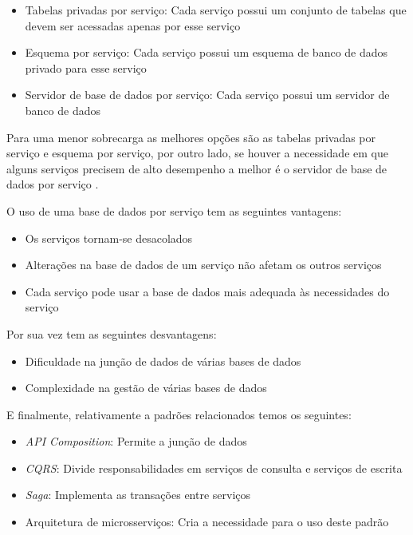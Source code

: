 \begin{itemize}
    \item Tabelas privadas por serviço: Cada serviço possui um conjunto de tabelas que devem ser acessadas apenas por esse serviço \cite{databasePerServicePattern}
    \item Esquema por serviço: Cada serviço possui um esquema de banco de dados privado para esse serviço \cite{databasePerServicePattern}
    \item Servidor de base de dados por serviço: Cada serviço possui um servidor de banco de dados \cite{databasePerServicePattern}
\end{itemize}

Para uma menor sobrecarga as melhores opções são as tabelas privadas por serviço e esquema por serviço, por outro lado, se houver a necessidade em que alguns serviços precisem de alto desempenho a melhor é o servidor de base de dados por serviço \cite{databasePerServicePattern}.

O uso de uma base de dados por serviço tem as seguintes vantagens:
\begin{itemize}
    \item Os serviços tornam-se desacolados \cite{databasePerServicePattern}
    \item Alterações na base de dados de um serviço não afetam os outros serviços \cite{databasePerServicePattern}
    \item Cada serviço pode usar a base de dados mais adequada às necessidades do serviço \cite{databasePerServicePattern}
\end{itemize}

Por sua vez tem as seguintes desvantagens:
\begin{itemize}
    \item Dificuldade na junção de dados de várias bases de dados \cite{databasePerServicePattern}
    \item Complexidade na gestão de várias bases de dados \cite{databasePerServicePattern}
\end{itemize}

E finalmente, relativamente a padrões relacionados temos os seguintes:
\begin{itemize}
    \item \textit{API Composition}: Permite a junção de dados 
    \item \textit{CQRS}: Divide responsabilidades em serviços de consulta e serviços de escrita 
    \item \textit{Saga}: Implementa as transações entre serviços  
    \item Arquitetura de microsserviços: Cria a necessidade para o uso deste padrão 
\end{itemize}


